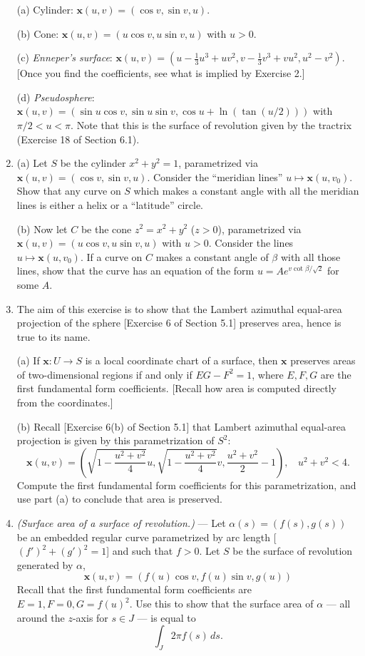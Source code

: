 \documentclass[leqno]{book}
\begin{document}
\begin{enumerate}
(a) Cylinder: $\mathbf x(u,v)=(\cos v,\sin v,u)$.

(b) Cone: $\mathbf x(u,v)=(u\cos v,u\sin v,u)$ with $u>0$.

(c) \emph{Enneper's surface}: $\mathbf x(u,v)=\left(u-\frac 13u^3+uv^2,v-\frac 13v^3+vu^2,u^2-v^2\right)$.  [Once you find the coefficients, see what is implied by Exercise 2.]

(d) \emph{Pseudosphere}: $\mathbf x(u,v)=(\sin u\cos v,\sin u\sin v,\cos u+\ln(\tan(u/2)))$ with $\pi/2<u<\pi$.  Note that this is the surface of revolution given by the tractrix (Exercise 18 of Section 6.1). %

\item (a) Let $S$ be the cylinder $x^2+y^2=1$, parametrized via $\mathbf x(u,v)=(\cos v,\sin v,u)$.  Consider the ``meridian lines'' $u\mapsto\mathbf x(u,v_0)$.  Show that any curve on $S$ which makes a constant angle with all the meridian lines is either a helix or a ``latitude'' circle.

(b) Now let $C$ be the cone $z^2=x^2+y^2$ ($z>0$), parametrized via $\mathbf x(u,v)=(u\cos v,u\sin v,u)$ with $u>0$.  Consider the lines $u\mapsto\mathbf x(u,v_0)$.  If a curve on $C$ makes a constant angle of $\beta$ with all those lines, show that the curve has an equation of the form $u=Ae^{v\cot\beta/\sqrt 2}$ for some $A$.

\item The aim of this exercise is to show that the Lambert azimuthal equal-area projection of the sphere [Exercise 6 of Section 5.1] preserves area, hence is true to its name.

(a) If $\mathbf x:U\to S$ is a local coordinate chart of a surface, then $\mathbf x$ preserves areas of two-dimensional regions if and only if $EG-F^2=1$, where $E,F,G$ are the first fundamental form coefficients. [Recall how area is computed directly from the coordinates.]

(b) Recall [Exercise 6(b) of Section 5.1] that Lambert azimuthal equal-area projection is given by this parametrization of $S^2$:
$$\mathbf x(u,v)=\left(\sqrt{1-\frac{u^2+v^2}4}u,\sqrt{1-\frac{u^2+v^2}4}v,\frac{u^2+v^2}2-1\right),~~~~u^2+v^2<4.$$
Compute the first fundamental form coefficients for this parametrization, and use part (a) to conclude that area is preserved.

\item\emph{(Surface area of a surface of revolution.)} \---- Let $\alpha(s)=(f(s),g(s))$ be an embedded regular curve parametrized by arc length [$(f')^2+(g')^2=1$] and such that $f>0$.  Let $S$ be the surface of revolution generated by $\alpha$,
$$\mathbf x(u,v)=(f(u)\cos v,f(u)\sin v,g(u))$$
Recall that the first fundamental form coefficients are $E=1,F=0,G=f(u)^2$.  Use this to show that the surface area of $\alpha$ \---- all around the $z$-axis for $s\in J$ \---- is equal to
$$\int_J 2\pi f(s)\,ds.$$


\end{enumerate}
\end{document}
